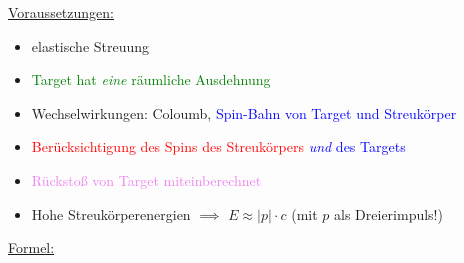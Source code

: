 \documentclass{subfiles}
\begin{document}
                \noindent\underline{Voraussetzungen:}
                \begin{itemize}
                        \item elastische Streuung
                        \item \textcolor{green}{Target hat \textit{eine} räumliche Ausdehnung}
                        \item Wechselwirkungen: Coloumb, \textcolor{blue}{Spin-Bahn von Target und Streukörper}
                        \item \textcolor{red}{Berücksichtigung des Spins des Streukörpers}\textcolor{blue}{ \textit{und} des Targets}
                        \item \textcolor{violet}{Rückstoß von Target miteinberechnet}
                        \item Hohe Streukörperenergien $\implies$ $E \approx \vert p\vert\cdot c$ (mit $p$ als Dreierimpuls!)
                \end{itemize}
                \noindent\underline{Formel:}
\end{document}
